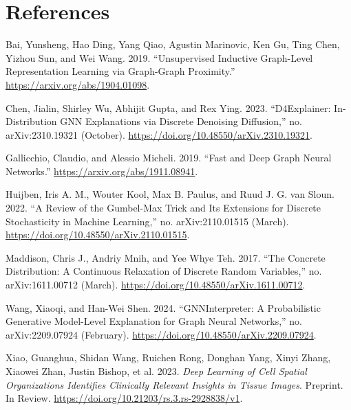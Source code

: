\documentclass[
  11pt,
  letterpaper,
]{article}
\newlength{\cslhangindent}
\newlength{\cslentryspacingunit} %
\newenvironment{CSLReferences}[2] %
 {%
  \setlength{\parindent}{0pt}
  \ifodd #1
  \let\oldpar\par
  \def\par{\hangindent=\cslhangindent\oldpar}
  \fi
  \setlength{\parskip}{#2\cslentryspacingunit}
 }%
 {}
\begin{document}
\pagebreak

\hypertarget{references}{%
\section*{References}\label{references}}

\hypertarget{refs}{}
\begin{CSLReferences}{1}{0}
\leavevmode{}%
Bai, Yunsheng, Hao Ding, Yang Qiao, Agustin Marinovic, Ken Gu, Ting
Chen, Yizhou Sun, and Wei Wang. 2019. {``Unsupervised Inductive
Graph-Level Representation Learning via Graph-Graph Proximity.''}
\url{https://arxiv.org/abs/1904.01098}.

\leavevmode{}%
Chen, Jialin, Shirley Wu, Abhijit Gupta, and Rex Ying. 2023.
{``D4Explainer: In-Distribution GNN Explanations via Discrete Denoising
Diffusion,''} no. arXiv:2310.19321 (October).
\url{https://doi.org/10.48550/arXiv.2310.19321}.

\leavevmode{}%
Gallicchio, Claudio, and Alessio Micheli. 2019. {``Fast and Deep Graph
Neural Networks.''} \url{https://arxiv.org/abs/1911.08941}.

\leavevmode{}%
Huijben, Iris A. M., Wouter Kool, Max B. Paulus, and Ruud J. G. van
Sloun. 2022. {``A Review of the Gumbel-Max Trick and Its Extensions for
Discrete Stochasticity in Machine Learning,''} no. arXiv:2110.01515
(March). \url{https://doi.org/10.48550/arXiv.2110.01515}.

\leavevmode{}%
Maddison, Chris J., Andriy Mnih, and Yee Whye Teh. 2017. {``The Concrete
Distribution: A Continuous Relaxation of Discrete Random Variables,''}
no. arXiv:1611.00712 (March).
\url{https://doi.org/10.48550/arXiv.1611.00712}.

\leavevmode{}%
Wang, Xiaoqi, and Han-Wei Shen. 2024. {``GNNInterpreter: A Probabilistic
Generative Model-Level Explanation for Graph Neural Networks,''} no.
arXiv:2209.07924 (February).
\url{https://doi.org/10.48550/arXiv.2209.07924}.

\leavevmode{}%
Xiao, Guanghua, Shidan Wang, Ruichen Rong, Donghan Yang, Xinyi Zhang,
Xiaowei Zhan, Justin Bishop, et al. 2023. \emph{Deep Learning of Cell
Spatial Organizations Identifies Clinically Relevant Insights in Tissue
Images}. Preprint. In Review.
\url{https://doi.org/10.21203/rs.3.rs-2928838/v1}.


\end{CSLReferences}
\end{document}
